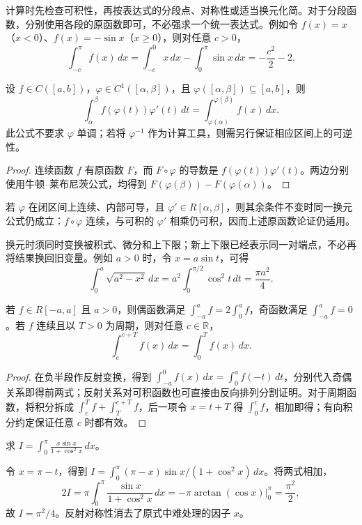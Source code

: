 计算时先检查可积性，再按表达式的分段点、对称性或适当换元化简。对于分段函数，分别使用各段的原函数即可，不必强求一个统一表达式。例如令 $f(x)=x$（$x<0$）、$f(x)=-\sin x$（$x\geq0$），则对任意 $c>0$，
\[
    \int_{-c}^{\pi}f(x)\,dx
    =\int_{-c}^0x\,dx-\int_0^\pi\sin x\,dx
    =-\frac{c^2}{2}-2.
\]

\begin{theorem}[定积分换元公式]
\label{thm:definite-integral-substitution}
设 $f\in C([a,b])$，$\varphi\in C^1([\alpha,\beta])$，且 $\varphi([\alpha,\beta])\subseteq[a,b]$，则
\begin{equation}
    \int_\alpha^\beta f(\varphi(t))\varphi'(t)\,dt
    =\int_{\varphi(\alpha)}^{\varphi(\beta)}f(x)\,dx.
    \label{eq:definite-integral-substitution}
\end{equation}
此公式不要求 $\varphi$ 单调；若将 $\varphi^{-1}$ 作为计算工具，则需另行保证相应区间上的可逆性。
\end{theorem}
\begin{proof}
连续函数 $f$ 有原函数 $F$，而 $F\circ\varphi$ 的导数是 $f(\varphi(t))\varphi'(t)$。两边分别使用牛顿--莱布尼茨公式，均得到 $F(\varphi(\beta))-F(\varphi(\alpha))$。
\end{proof}

若 $\varphi$ 在闭区间上连续、内部可导，且 $\varphi'\in R[\alpha,\beta]$，则其余条件不变时同一换元公式仍成立：$f\circ\varphi$ 连续，与可积的 $\varphi'$ 相乘仍可积，因而上述原函数论证仍适用。

换元时须同时变换被积式、微分和上下限；新上下限已经表示同一对端点，不必再将结果换回旧变量。例如 $a>0$ 时，令 $x=a\sin t$，可得
\[
    \int_0^a\sqrt{a^2-x^2}\,dx
    =a^2\int_0^{\pi/2}\cos^2t\,dt=\frac{\pi a^2}{4}.
\]

\begin{proposition}[对称性与周期性]
\label{prop:integral-symmetry-and-periodicity}
若 $f\in R[-a,a]$ 且 $a>0$，则偶函数满足 $\int_{-a}^a f=2\int_0^a f$，奇函数满足 $\int_{-a}^a f=0$。若 $f$ 连续且以 $T>0$ 为周期，则对任意 $c\in\mathbb R$，
\[
    \int_c^{c+T}f(x)\,dx=\int_0^T f(x)\,dx.
\]
\end{proposition}
\begin{proof}
在负半段作反射变换，得到 $\int_{-a}^0f(x)\,dx=\int_0^af(-t)\,dt$，分别代入奇偶关系即得前两式；反射关系对可积函数也可直接由反向排列分割证明。对于周期函数，将积分拆成 $\int_c^T f+\int_T^{c+T}f$，后一项令 $x=t+T$ 得 $\int_0^cf$，相加即得；有向积分约定保证任意 $c$ 时都有效。
\end{proof}

\begin{example}
\label{ex:reflection-integral-x-sine}
求 $\displaystyle I=\int_0^\pi\frac{x\sin x}{1+\cos^2x}\,dx$。
\end{example}
\begin{solve}
令 $x=\pi-t$，得到 $I=\int_0^\pi(\pi-x)\sin x/(1+\cos^2x)\,dx$。将两式相加，
\[
    2I=\pi\int_0^\pi\frac{\sin x}{1+\cos^2x}\,dx
    =-\pi\left.\arctan(\cos x)\right|_0^\pi=\frac{\pi^2}{2},
\]
故 $I=\pi^2/4$。反射对称性消去了原式中难处理的因子 $x$。
\end{solve}

